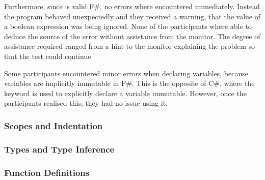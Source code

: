 Furthermore, since  is valid F\#, no errors where encountered immediately. Instead the program behaved unexpectedly and they received a warning, that the value of a boolean expression was being ignored. None of the participants where able to deduce the source of the error without assistance from the monitor. The degree of assistance required ranged from a hint to the monitor explaining the problem so that the test could continue.

Some participants encountered minor errors when declaring variables, because variables are implicitly immutable in F\#. This is the opposite of C\#, where the  keyword is used to explicitly declare a variable immutable. However, once the participants realised this, they had no issue using it.

\subsubsection{Scopes and Indentation}


\subsubsection{Types and Type Inference}


\subsubsection{Function Definitions}


